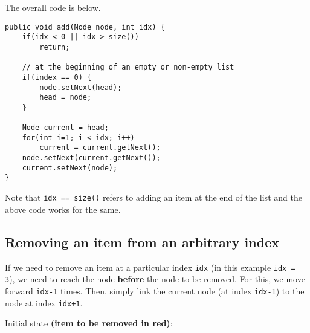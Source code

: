 \newpage

The overall code is below.

\begin{lstlisting}
public void add(Node node, int idx) {
	if(idx < 0 || idx > size()) 
		return;
	
	// at the beginning of an empty or non-empty list
	if(index == 0) { 
		node.setNext(head);
		head = node;
	}
	
	Node current = head;
	for(int i=1; i < idx; i++)
		current = current.getNext();
	node.setNext(current.getNext());
	current.setNext(node);
}
\end{lstlisting}

Note that \texttt{idx == size()} refers to adding an item at the end of the list and the above code works for the same.

\newpage

\subsection{Removing an item from an arbitrary index}

If we need to remove an item at a particular index \texttt{idx} (in this example \texttt{idx = 3}), we need to reach the node \textbf{before} the node to be removed. For this, we move forward \texttt{idx-1} times. Then, simply link the current node (at index \texttt{idx-1}) to the node at index \texttt{idx+1}.

Initial state \textbf{(item to be removed in red)}:
\vskip 0.2cm

\bgroup \tikzset{png export}  \egroup
\vskip 0.2cm

